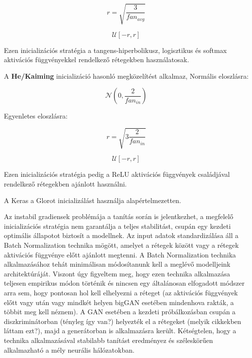 $$r = \sqrt{\frac{3}{fan_{avg}}}$$

$$ \mathcal{U}\left[-r, r\right] $$

Ezen inicializációs stratégia a tangens-hiperbolikusz, logisztikus és softmax aktivációs függvényekkel rendelkező rétegekben használatosak. 

A \textbf{He/Kaiming} inicializáció hasonló megközelítést alkalmaz,
Normális eloszlásra:

$$ \mathcal{N}(0, \frac{2}{fan_{in}}) $$

Egyenletes eloszlásra:

$$r = \sqrt{3\frac{2}{fan_{in}}}$$

$$ \mathcal{U}\left[-r, r\right] $$

Ezen inicializációs stratégia pedig a ReLU aktivációs függvények családjával rendelkező rétegekben ajánlott használni.

A Keras a Glorot inicializálást használja alapértelmezetten.



Az instabil gradiensek problémája a tanítás során is jelentkezhet, a megfelelő inicializációs stratégia nem garantálja a teljes stabilitást, csupán egy kezdeti optimális állapotot biztosít a modellnek.
Az input adatok standardizálása áll a Batch Normalization technika mögött, amelyet a rétegek között vagy a rétegek aktivációs függvénye előtt ajánlott megtenni. A Batch Normalization technika alkalmazásához tehát minimálisan módosítanunk kell a meglévő modelljeink architektúráját. Viszont úgy figyeltem meg, hogy ezen technika alkalmazása teljesen empirikus módon történik és nincsen egy általánosan elfogadott módszer arra sem, hogy pontosan hol kell elhelyezni a réteget (az aktivációs függvények előtt vagy után vagy mindkét helyen bigGAN esetében mindenhova rakták, a többit meg kell néznem). A GAN esetében a kezdeti próbálkozásban csupán a diszkriminátorban (tényleg így van?) helyezték el a rétegeket (melyik cikkekben láttam ezt?), majd a generátorban is alkalmazásra került. Kétségtelen, hogy a technika alkalmazásával stabilabb tanítást eredményez és széleskörűen alkalmazható a mély neurális hálózatokban.

